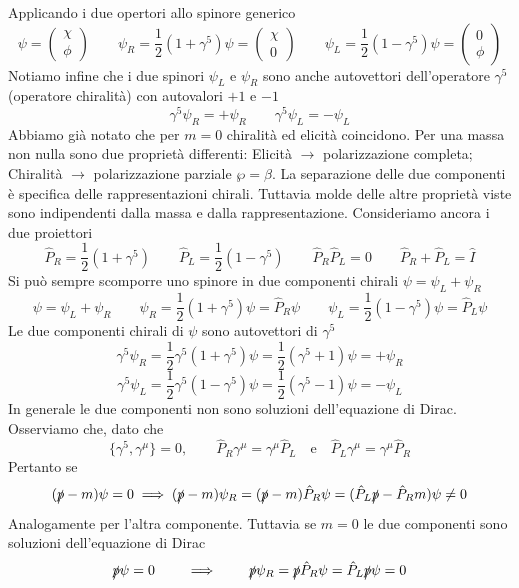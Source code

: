 Applicando i due opertori allo spinore generico
$$
\psi = \begin{pmatrix} \chi \\ \phi \end{pmatrix} \qquad \psi_R = \frac{1}{2}(1 + \gamma^5)\psi = \begin{pmatrix} \chi \\ 0 \end{pmatrix} \qquad \psi_L = \frac{1}{2}(1 - \gamma^5)\psi = \begin{pmatrix} 0 \\ \phi \end{pmatrix}
$$ 
Notiamo infine che i due spinori $\psi_L$ e $\psi_R$ sono anche autovettori dell'operatore $\gamma^5$ (operatore chiralità) con autovalori $+1$ e $-1$
$$
\gamma^5 \psi_R = +\psi_R \qquad \gamma^5 \psi_L = -\psi_L
$$
Abbiamo già notato che per $m=0$ chiralità ed elicità coincidono. Per una massa non nulla sono due proprietà differenti: Elicità $\to$ polarizzazione completa; Chiralità $\to$ polarizzazione parziale $\wp=\beta$. La separazione delle due componenti è specifica delle rappresentazioni chirali. Tuttavia molde delle altre proprietà viste sono indipendenti dalla massa e dalla rappresentazione. Consideriamo ancora i due proiettori
$$
\hat{P}_R = \frac{1}{2}(1 + \gamma^5) \qquad \hat{P}_L = \frac{1}{2}(1 - \gamma^5) \qquad \hat{P}_R \hat{P}_L = 0 \qquad \hat{P}_R + \hat{P}_L = \hat{I}
$$
Si può sempre scomporre uno spinore in due componenti chirali $\psi=\psi_L+\psi_R$
$$
\psi = \psi_L + \psi_R \qquad \psi_R = \frac{1}{2}(1 + \gamma^5)\psi = \hat{P}_R \psi \qquad \psi_L = \frac{1}{2}(1 - \gamma^5)\psi = \hat{P}_L \psi
$$
Le due componenti chirali di $\psi$ sono autovettori di $\gamma^5$
$$
\gamma^5 \psi_R = \frac{1}{2}\gamma^5(1 + \gamma^5)\psi = \frac{1}{2}(\gamma^5 + 1)\psi = +\psi_R
$$
$$
\gamma^5 \psi_L = \frac{1}{2}\gamma^5(1 - \gamma^5)\psi = \frac{1}{2}(\gamma^5 - 1)\psi = -\psi_L
$$
In generale le due componenti non sono soluzioni dell'equazione di Dirac. Osserviamo che, dato che $$
\{\gamma^5, \gamma^\mu\} = 0, \qquad \hat{P}_R \gamma^\mu = \gamma^\mu \hat{P}_L \quad \text{e} \quad \hat{P}_L \gamma^\mu = \gamma^\mu \hat{P}_R
$$
Pertanto se
$$
(\slashed{p} - m)\psi = 0 \implies (\slashed{p} - m)\psi_R = (\slashed{p} - m)\hat{P}_R \psi = (\hat{P}_L \slashed{p} - \hat{P}_R m)\psi \neq 0
$$
Analogamente per l'altra componente. Tuttavia se $m=0$ le due componenti sono soluzioni dell'equazione di Dirac
$$
\slashed{p}\psi = 0 \qquad \implies \qquad \slashed{p}\psi_R = \slashed{p}\hat{P}_R \psi = \hat{P}_L \slashed{p}\psi = 0
$$
